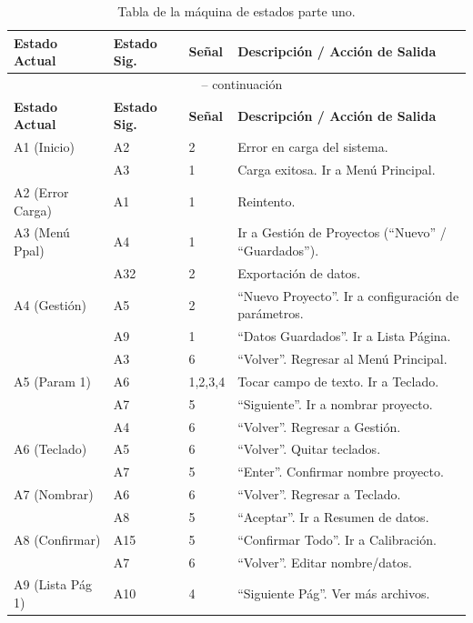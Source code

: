 \documentclass[11pt,tesis,twoside,openright,spanish]{upiiztt}
\begin{document}
\begin{longtable}{p{2.5cm}p{1.5cm}p{1.5cm}p{7cm}}
\caption{Tabla de la máquina de estados parte uno.}
\label{tab:estados1}\\
\toprule
\textbf{Estado Actual} & \textbf{Estado Sig.} & \textbf{Señal} & \textbf{Descripción / Acción de Salida} \\
\midrule
\endfirsthead
\multicolumn{4}{c}{\tablename\ \thetable{} -- continuación}\\
\toprule
\textbf{Estado Actual} & \textbf{Estado Sig.} & \textbf{Señal} & \textbf{Descripción / Acción de Salida} \\
\midrule
\endhead
\bottomrule
\endfoot
A1 (Inicio)       & A2 & 2 & Error en carga del sistema. \\
                  & A3 & 1 & Carga exitosa. Ir a Menú Principal. \\
A2 (Error Carga)  & A1 & 1 & Reintento. \\
A3 (Menú Ppal)    & A4 & 1 & Ir a Gestión de Proyectos (``Nuevo'' / ``Guardados''). \\
                  & A32 & 2 & Exportación de datos. \\
A4 (Gestión)      & A5 & 2 & ``Nuevo Proyecto''. Ir a configuración de parámetros. \\
                  & A9 & 1 & ``Datos Guardados''. Ir a Lista Página. \\
                  & A3 & 6 & ``Volver''. Regresar al Menú Principal. \\
A5 (Param 1)      & A6 & 1,2,3,4 & Tocar campo de texto. Ir a Teclado. \\
                  & A7 & 5 & ``Siguiente''. Ir a nombrar proyecto. \\
                  & A4 & 6 & ``Volver''. Regresar a Gestión. \\
A6 (Teclado)      & A5 & 6 & ``Volver''. Quitar teclados. \\
                  & A7 & 5 & ``Enter''. Confirmar nombre proyecto. \\
A7 (Nombrar)      & A6 & 6 & ``Volver''. Regresar a Teclado. \\
                  & A8 & 5 & ``Aceptar''. Ir a Resumen de datos. \\
A8 (Confirmar)    & A15 & 5 & ``Confirmar Todo''. Ir a Calibración. \\
                  & A7 & 6 & ``Volver''. Editar nombre/datos. \\
A9 (Lista Pág 1)  & A10 & 4 & ``Siguiente Pág''. Ver más archivos. \\

\end{longtable}
\end{document}
